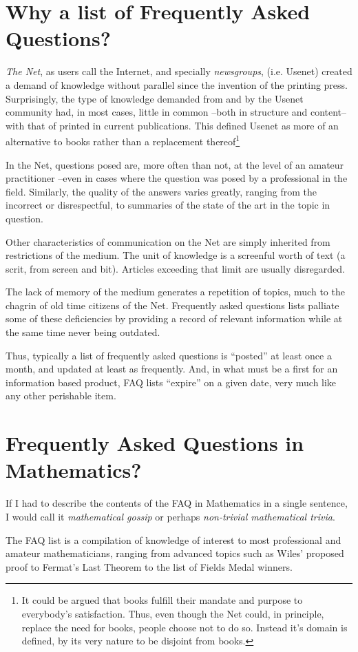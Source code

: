 


\section{Why a list of Frequently Asked Questions?}

{\it The Net}, as users call the Internet, and specially {\it
newsgroups}, (i.e. Usenet) created a demand of knowledge without
parallel since the invention of the printing press.  Surprisingly, the
type of knowledge demanded from and by the Usenet community had, in
most cases, little in common --both in structure and content-- with
that of printed in current publications. This defined Usenet as more of an
alternative to books rather than a replacement thereof\footnote{It could be
argued that books fulfill their mandate and purpose to everybody's
satisfaction.  Thus, even though the Net could, in principle, replace
the need for books, people choose not to do so. Instead it's domain is
defined, by its very nature to be disjoint from books.}

In the Net, questions posed are, more often than not, at the level 
of an amateur practitioner --even in cases where the question
was posed by a professional in the field. Similarly, the quality of the
answers  varies greatly, ranging from the incorrect or disrespectful,
to summaries of the state of the art in the topic in question.

Other characteristics of communication on the Net are simply inherited
from restrictions of the medium. The unit of knowledge is a screenful
worth of text (a scrit, from screen and bit). Articles exceeding that
limit are usually disregarded.

The lack of memory of the medium generates a repetition of topics,
much to the chagrin of old time citizens of the Net. 
Frequently asked questions lists palliate some of these deficiencies by
providing a record of relevant information while at the same time 
never being outdated. 

Thus, typically a list of frequently asked questions is ``posted''
at least once a month, and updated at least as frequently. And,
in what must be a first for an information based product, FAQ lists 
``expire'' on a given date, very much like any other  perishable item.


\section{Frequently Asked Questions in Mathematics?}

If I had to describe the contents of the FAQ in Mathematics
in a single sentence, I would call it {\it mathematical gossip}
or perhaps {\it non-trivial mathematical trivia}.

The FAQ list is a compilation of knowledge of interest to most
professional and amateur mathematicians, ranging from advanced
topics such as Wiles' proposed proof to Fermat's Last Theorem
to the list of Fields Medal winners.


